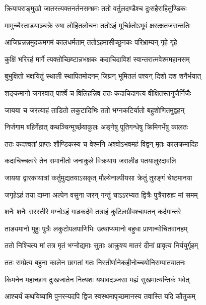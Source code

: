 \twolineshloka
{क्रियापराङ्मुखो जातस्त्यक्तनर्तनसम्भ्रमः}
{ततो वर्तुलदण्डैश्च दुःसहैराहितुण्डिकः} %

\twolineshloka
{मामुच्चैस्ताडयाञ्चक्रे रुषा लोहितलोचनः}
{ततोऽहं मूर्च्छितोऽभूवं क्षरत्क्षतजसन्ततिः} %

\twolineshloka
{आजिघ्रन्नन्नमुदकमगमं कालधर्मताम्}
{ततोऽहमासीच्छुनकः परिभ्राम्यन् गृहे गृहे} %

\twolineshloka
{कुक्षिं भरिरहं मार्गे त्यक्तोच्छिष्टान्नभक्षकः}
{कदाचिदाविशं स्वान्तरात्मवेश्ममहानसम्} %

\twolineshloka
{बुभुक्षितो भक्षयितुं स्थाली स्थापितमोदनम्}
{जिघ्रन् भूमितलं पश्यन् दिशो दश शनैर्भयात्} %

\twolineshloka
{शङ्कमानो जनरवात् पार्श्वे च विलिहन्निव}
{ततः कदाचिदागत्य वीक्षितस्तनुजैर्निजैः} %

\twolineshloka
{जायया च जरत्याहं ताडितो लकुटादिभिः}
{ततो भग्नकटिर्यातो बहुशोणितमुद्वहन्} %

\twolineshloka
{निर्जगाम बहिर्गेहात् कथञ्चिन्मूर्च्छयाकुलः}
{अङ्गेषु पूतिगन्धेषु क्रिमिगर्भेषु कालतः} %

\twolineshloka
{ततः कदश्वतां प्राप्तः शौण्डिकस्य च वेश्मनि}
{अश्वोऽभवमहं विद्वन् मृतः कालक्रमादिह} %

\twolineshloka
{कदाचिच्चत्वरे तेन समानीतो जनाकुले}
{विक्रयाय जरालीढ पतयालुरदावलि} %

\twolineshloka
{जायया द्वारकायात्रां कर्तुमुद्यतयाऽसकृत्}
{मौल्येनाल्पीयसा क्रेतुं तुरङ्गं चेष्टमानया} %

\twolineshloka
{जगृहेऽहं तया दाम्ना अल्पेन वसुना जरन्}
{गन्तुं चाऽऽरभ्यत द्वित्रैः पुत्रैरारुह्य मां समम्} %

\twolineshloka
{शनैः शनैः सरस्तीरे मग्नोऽहं गाढकर्दमे}
{तत्राहं कुटिलग्रीवश्चापतन् कर्दमान्तरे} %

\twolineshloka
{ताड्यमानो मुहुः पुत्रैः लकुटोपलपाणिभिः}
{उत्थाप्यमानो बहुधा प्राणान्मोचितवानहम्} %

\twolineshloka
{ततो निश्चित्य मां तत्र मृतं भग्नोद्यमाः सुताः}
{आक्रुश्य मातरं दीनां प्रावृत्य निर्ययुर्गृहम्} %

\twolineshloka
{ततः सम्प्रेत्य बहुना कालेन छागतां गतः}
{निस्तीर्णानेकहीनोच्चयोनिसम्पातयातनः} %


\twolineshloka
{किमनेन महाच्छाग दुःखजातेन नित्यशः}
{यथावदञ्जसा मह्यं सुखमात्यन्तिकं भवेत्} %


\twolineshloka
{आश्चर्यं कथयिष्यामि पुनरन्यदपि द्विज}
{स्वस्थमापृच्छमानस्य तवास्ति यदि कौतुकम्} %

